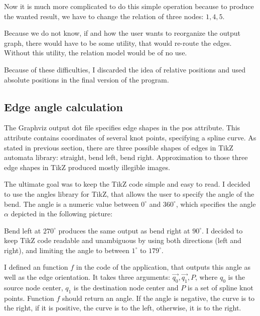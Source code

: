 \documentclass{ctuthesis}
\begin{document}
Now it is much more complicated to do this simple operation because to produce the wanted result, we have to change the relation of three nodes: $1, 4, 5$. 

Because we do not know, if and how the user wants to reorganize the output graph, there would have to be some utility, that would re-route the edges. Without this utility, the relation model would be of no use.

Because of these difficulties, I discarded the idea of relative positions and used absolute positions in the final version of the program.

\subsection{Edge angle calculation}
\label{subsec:edge-angle}
The Graphviz output dot file specifies edge shapes in the pos attribute. This attribute contains coordinates of several knot points, specifying a spline curve. As stated in previous section, there are three possible shapes of edges in TikZ automata library: straight, bend left, bend right. Approximation to those three edge shapes in TikZ produced mostly illegible images. 

The ultimate goal was to keep the TikZ code simple and easy to read. I decided to use the angles library for TikZ, that allows the user to specify the angle of the bend. The angle is a numeric value between $0^\circ$ and $360^\circ$, which specifies the angle $\alpha$ depicted in the following picture:

\begin{figure}[H]
\end{figure}

Bend left at $270^\circ$ produces the same output as bend right at $90^\circ$. I decided to keep TikZ code readable and unambiguous by using both directions (left and right), and limiting the angle to between $1^\circ$ to $179^\circ$.

I defined an function $f$ in the code of the application, that outputs this angle as well as the edge orientation. It takes three arguments: $\vec{q_0}, \vec{q_1}, P$, where $q_0$ is the source node center, $q_1$ is the destination node center and $P$ is a set of spline knot points. Function $f$ should return an angle. If the angle is negative, the curve is to the right, if it is positive, the curve is to the left, otherwise, it is to the right. 
\end{document}
